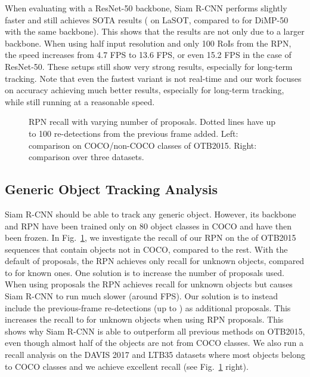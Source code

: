\documentclass[10pt,twocolumn,letterpaper]{article}
\begin{document}
When evaluating with a ResNet-50 backbone, Siam R-CNN performs slightly faster and still achieves SOTA results ( on LaSOT, compared to  for DiMP-50 with the same backbone). This shows that the results are not only due to a larger backbone. When using half input resolution and only 100 RoIs from the RPN, the speed increases from 4.7 FPS to 13.6 FPS, or even 15.2 FPS in the case of ResNet-50. These setups still show very strong results, especially for long-term tracking. Note that even the fastest variant is not real-time and our work focuses on accuracy achieving much better results, especially for long-term tracking, while still running at a reasonable speed.




\begin{figure}[t]
\centering
\caption{RPN recall with varying number of proposals. Dotted lines have up to 100 re-detections from the previous frame added. Left: comparison on COCO/non-COCO classes of OTB2015. Right: comparison over three datasets.}
\label{fig:objectness}
\end{figure}

\subsection{Generic Object Tracking Analysis}
Siam R-CNN should be able to track any generic object. However, its backbone and RPN have been trained only on 80 object classes in COCO and have then been frozen. In Fig.~\ref{fig:objectness}, we investigate the recall of our RPN on the  of OTB2015 sequences that contain objects not in COCO, compared to the rest. With the default of  proposals, the RPN achieves only  recall for unknown objects, compared to  for known ones. One solution is to increase the number of proposals used. When using  proposals the RPN achieves  recall for unknown objects but causes Siam R-CNN to run much slower (around  FPS). Our solution is to instead include the previous-frame re-detections (up to ) as additional proposals. This increases the recall to  for unknown objects when using  RPN proposals. This shows why Siam R-CNN is able to outperform all previous methods on OTB2015, even though almost half of the objects are not from COCO classes. We also run a recall analysis on the DAVIS 2017 and LTB35 datasets where
  most objects belong to COCO classes and we achieve excellent recall (see Fig.~\ref{fig:objectness} right).
\end{document}
